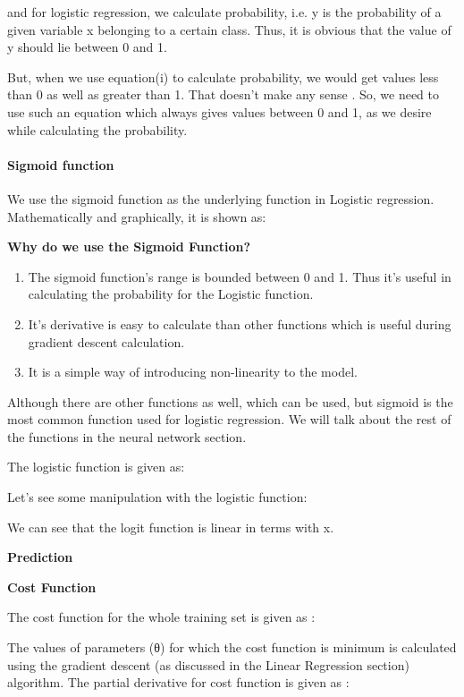 \documentclass[11pt]{article}
\providecommand{\tightlist}{%
      \setlength{\itemsep}{0pt}\setlength{\parskip}{0pt}}
\begin{document}
and for logistic regression, we calculate probability, i.e. y is the
probability of a given variable x belonging to a certain class. Thus, it
is obvious that the value of y should lie between 0 and 1.

But, when we use equation(i) to calculate probability, we would get
values less than 0 as well as greater than 1. That doesn't make any
sense . So, we need to use such an equation which always gives values
between 0 and 1, as we desire while calculating the probability.

    \paragraph{Sigmoid function}\label{sigmoid-function}

We use the sigmoid function as the underlying function in Logistic
regression. Mathematically and graphically, it is shown as:

\textbf{Why do we use the Sigmoid Function?}

\begin{enumerate}
\def\labelenumi{\arabic{enumi})}
\tightlist
\item
  The sigmoid function's range is bounded between 0 and 1. Thus it's
  useful in calculating the probability for the Logistic function.
\item
  It's derivative is easy to calculate than other functions which is
  useful during gradient descent calculation.
\item
  It is a simple way of introducing non-linearity to the model.
\end{enumerate}

Although there are other functions as well, which can be used, but
sigmoid is the most common function used for logistic regression. We
will talk about the rest of the functions in the neural network section.

The logistic function is given as:

Let's see some manipulation with the logistic function:

We can see that the logit function is linear in terms with x.

    \textbf{Prediction}

    \textbf{Cost Function}

The cost function for the whole training set is given as :

The values of parameters (θ) for which the cost function is minimum is
calculated using the gradient descent (as discussed in the Linear
Regression section) algorithm. The partial derivative for cost function
is given as :
\end{document}

